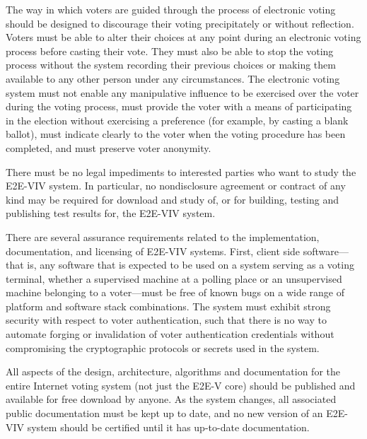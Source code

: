 The way in which voters are guided through the process of electronic
voting should be designed to discourage their voting precipitately or
without reflection. Voters must be able to alter their choices at any
point during an electronic voting process before casting their
vote. They must also be able to stop the voting process without the
system recording their previous choices or making them available to
any other person under any circumstances. The electronic voting system
must not enable any manipulative influence to be exercised over the
voter during the voting process, must provide the voter with a means
of participating in the election without exercising a preference (for
example, by casting a blank ballot), must indicate clearly to the
voter when the voting procedure has been completed, and must preserve
voter anonymity.

There must be no legal impediments to interested parties who want to
study the E2E-VIV system. In particular, no nondisclosure agreement or
contract of any kind may be required for download and study of, or for
building, testing and publishing test results for, the E2E-VIV system.


There are several assurance requirements related to the
implementation, documentation, and licensing of E2E-VIV
systems. First, client side software---that is, any software that is
expected to be used on a system serving as a voting terminal, whether
a supervised machine at a polling place or an unsupervised machine
belonging to a voter---must be free of known bugs on a wide range of
platform and software stack combinations. The system must exhibit
strong security with respect to voter authentication, such that there
is no way to automate forging or invalidation of voter authentication
credentials without compromising the cryptographic protocols or
secrets used in the system.

All aspects of the design, architecture, algorithms and documentation
for the entire Internet voting system (not just the E2E-V core) should
be published and available for free download by anyone. As the system
changes, all associated public documentation must be kept up to date,
and no new version of an E2E-VIV system should be certified until it
has up-to-date documentation.

